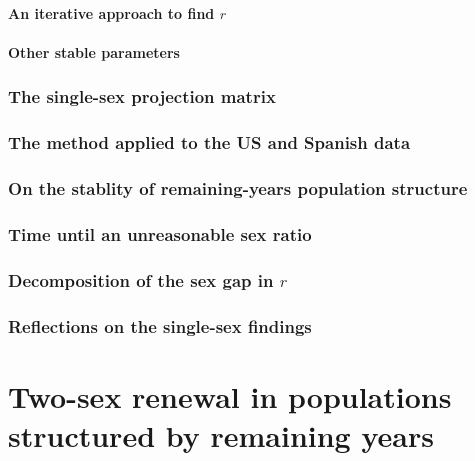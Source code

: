       \subsection{An iterative approach to find $r$}
        
        
      \subsection{Other stable parameters}
        
      
    \section{The single-sex projection matrix}
      
    \section{The method applied to the US and Spanish data}
      
    \section{On the stablity of remaining-years population structure}
      
    \section{Time until an unreasonable sex ratio}
      
    \section{Decomposition of the sex gap in $r$}
      
      
    \section{Reflections on the single-sex findings}
      
\part*{Two-sex renewal in populations structured by remaining years}
  
  

